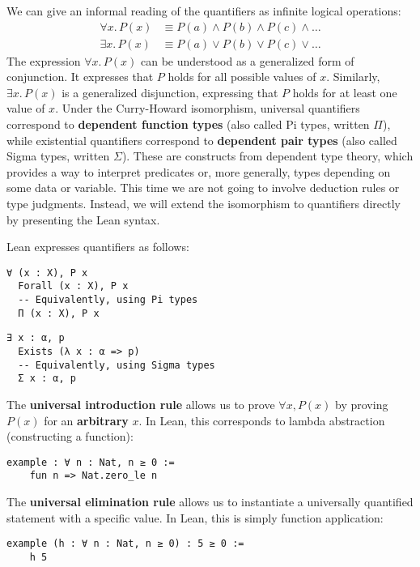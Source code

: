 We can give an informal reading of the quantifiers as infinite logical operations:
\begin{align*}
  \forall x.\,P(x) & \equiv P(a) \land P(b) \land P(c) \land \ldots \\
  \exists x.\,P(x) & \equiv P(a) \lor P(b) \lor P(c) \lor \ldots
\end{align*}
The expression $\forall x.\, P(x)$ can be understood as a generalized form of conjunction.
It expresses that $P$ holds for all possible values of $x$.
Similarly, $\exists x.\, P(x)$ is a generalized disjunction, expressing that $P$ holds
for at least one value of $x$.
Under the Curry-Howard isomorphism, universal quantifiers correspond to
\textbf{dependent function types} (also called Pi types, written $\Pi$),
while existential quantifiers correspond to
\textbf{dependent pair types} (also called Sigma types, written $\Sigma$).
These are constructs from dependent type theory, which provides a way to interpret
predicates or, more generally, types depending on some data or variable.
This time we are not going to involve deduction rules or type judgments.
Instead, we will extend the isomorphism
to quantifiers directly
by presenting the Lean syntax.
\begin{example}
  Lean expresses quantifiers as follows:
  \begin{lstlisting}[language=lean]
  ∀ (x : X), P x
  Forall (x : X), P x
  -- Equivalently, using Pi types
  Π (x : X), P x
  \end{lstlisting}
  \begin{lstlisting}[language=lean]
  ∃ x : α, p
  Exists (λ x : α => p)
  -- Equivalently, using Sigma types
  Σ x : α, p
  \end{lstlisting}
\end{example}
\begin{example}
  The \textbf{universal introduction rule} allows us to prove $\forall x, P(x)$
  by proving $P(x)$ for an \textbf{arbitrary} $x$.
  In Lean, this corresponds to lambda abstraction (constructing a function):
  \newpage
  \begin{lstlisting}[language=lean]
  example : ∀ n : Nat, n ≥ 0 :=
    fun n => Nat.zero_le n
  \end{lstlisting}
\end{example}
\begin{example}
  The \textbf{universal elimination rule} allows us to instantiate
  a universally quantified statement with a specific value.
  In Lean, this is simply function application:
  \begin{lstlisting}[language=lean]
  example (h : ∀ n : Nat, n ≥ 0) : 5 ≥ 0 :=
    h 5
  \end{lstlisting}
\end{example}
